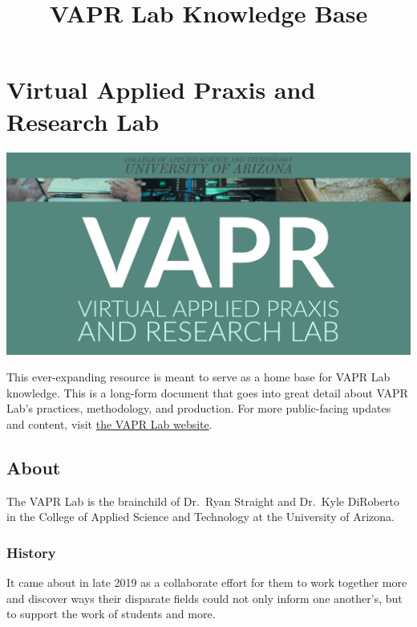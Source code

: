 \documentclass[12pt,]{memoir}
\title{VAPR Lab Knowledge Base}
\author{}
\date{}
\begin{document}
\maketitle

{
\hypersetup{linkcolor=black}
\setcounter{tocdepth}{1}
\tableofcontents
}
\listoftables
\listoffigures
\hypertarget{virtual-applied-praxis-and-research-lab}{%
\chapter*{Virtual Applied Praxis and Research Lab}\label{virtual-applied-praxis-and-research-lab}}

\includegraphics[width=30in]{images/VAPR-brand-banner}

This ever-expanding resource is meant to serve as a home base for VAPR Lab knowledge. This is a long-form document that goes into great detail about VAPR Lab's practices, methodology, and production. For more public-facing updates and content, visit \href{https://VAPR-Lab.github.io/vapr-website}{the VAPR Lab website}.

\hypertarget{about}{%
\section*{About}\label{about}}

The VAPR Lab is the brainchild of Dr.~Ryan Straight and Dr.~Kyle DiRoberto in the College of Applied Science and Technology at the University of Arizona.

\hypertarget{history}{%
\subsection{History}\label{history}}

It came about in late 2019 as a collaborate effort for them to work together more and discover ways their disparate fields could not only inform one another's, but to support the work of students and more.
\end{document}
